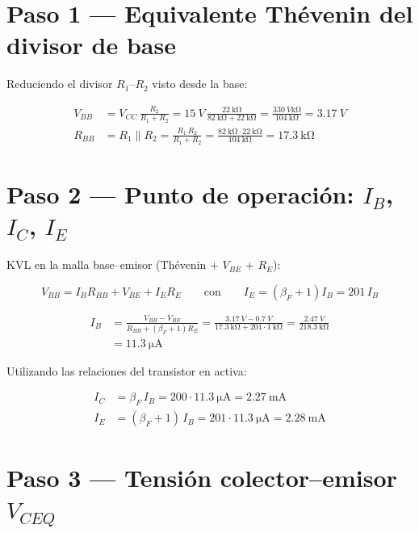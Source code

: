 \documentclass[11pt,a4paper]{article}
\begin{document}
\section{Paso 1 — Equivalente Thévenin del divisor de base}

Reduciendo el divisor $R_1$–$R_2$ visto desde la base:

\begin{align*}
  V_{BB} &= V_{CC}\,\frac{R_2}{R_1 + R_2}
           = \SI{15}{V}\,\frac{\SI{22}{\kilo\ohm}}{\SI{82}{\kilo\ohm} + \SI{22}{\kilo\ohm}}
           = \frac{\SI{330}{V\kilo\ohm}}{\SI{104}{\kilo\ohm}} = \SI{3.17}{V}\\
  R_{BB} &= R_1 \parallel R_2
           = \frac{R_1\,R_2}{R_1 + R_2}
           = \frac{\SI{82}{\kilo\ohm}\cdot\SI{22}{\kilo\ohm}}{\SI{104}{\kilo\ohm}}
           = \SI{17.3}{\kilo\ohm}
\end{align*}

\section{Paso 2 — Punto de operación: $I_B$, $I_C$, $I_E$}

KVL en la malla base–emisor (Thévenin + $V_{BE}$ + $R_E$):

\begin{equation*}
  V_{BB} = I_B R_{BB} + V_{BE} + I_E R_E
  \qquad\text{con}\qquad
  I_E = (\beta_F + 1) I_B = 201\, I_B
\end{equation*}

\begin{align*}
  I_B &= \frac{V_{BB} - V_{BE}}{R_{BB} + (\beta_F+1)R_E}
        = \frac{\SI{3.17}{V} - \SI{0.7}{V}}{\SI{17.3}{\kilo\ohm} + 201\cdot\SI{1}{\kilo\ohm}}
        = \frac{\SI{2.47}{V}}{\SI{218.3}{\kilo\ohm}}\\
      &= \SI{11.3}{\micro\ampere}
\end{align*}

Utilizando las relaciones del transistor en activa:

\begin{align*}
  I_C &= \beta_F\, I_B = 200 \cdot \SI{11.3}{\micro\ampere} = \SI{2.27}{\milli\ampere}\\
  I_E &= (\beta_F+1)\, I_B = 201 \cdot \SI{11.3}{\micro\ampere} = \SI{2.28}{\milli\ampere}
\end{align*}

\section{Paso 3 — Tensión colector–emisor $V_{CEQ}$}
\end{document}
